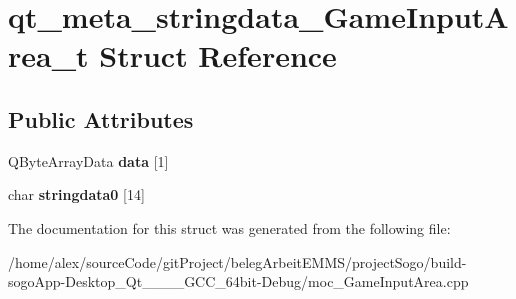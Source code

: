 \hypertarget{structqt__meta__stringdata__GameInputArea__t}{\section{qt\-\_\-meta\-\_\-stringdata\-\_\-\-Game\-Input\-Area\-\_\-t Struct Reference}
\label{structqt__meta__stringdata__GameInputArea__t}
}
\subsection*{Public Attributes}
\begin{DoxyCompactItemize}
\item 
\hypertarget{structqt__meta__stringdata__GameInputArea__t_a17d65b1c337cd93a92bdf95c999cfb0f}{Q\-Byte\-Array\-Data {\bfseries data} \mbox{[}1\mbox{]}}\label{structqt__meta__stringdata__GameInputArea__t_a17d65b1c337cd93a92bdf95c999cfb0f}

\item 
\hypertarget{structqt__meta__stringdata__GameInputArea__t_a9a25a04a824bfe71694fe3839a6937bd}{char {\bfseries stringdata0} \mbox{[}14\mbox{]}}\label{structqt__meta__stringdata__GameInputArea__t_a9a25a04a824bfe71694fe3839a6937bd}

\end{DoxyCompactItemize}


The documentation for this struct was generated from the following file\-:\begin{DoxyCompactItemize}
\item 
/home/alex/source\-Code/git\-Project/beleg\-Arbeit\-E\-M\-M\-S/project\-Sogo/build-\/sogo\-App-\/\-Desktop\-\_\-\-Qt\-\_\-\_\-\_\-\_\-\-G\-C\-C\-\_\-64bit-\/\-Debug/moc\-\_\-\-Game\-Input\-Area.\-cpp\end{DoxyCompactItemize}
